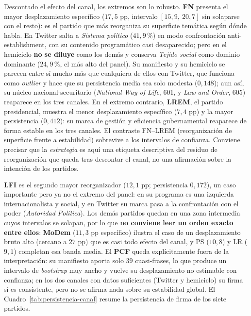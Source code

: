 Descontado el efecto del canal, los extremos son lo robusto. \textbf{FN} presenta
el mayor desplazamiento específico ($17{,}5$ pp, intervalo $[15{,}9,\ 20{,}7]$ sin
solaparse con el resto): es el partido que más reorganiza su superficie temática
según dónde habla. En Twitter salta a \emph{Sistema político} ($41{,}9\,\%$) en
modo confrontación anti-establishment, con su contenido programático casi
desaparecido; pero en el hemiciclo \textbf{no se diluye} como los demás y conserva
\emph{Tejido social} como dominio dominante ($24{,}9\,\%$, el más alto del
panel). Su manifiesto y su hemiciclo se parecen entre sí mucho más que cualquiera
de ellos con Twitter, que funciona como \emph{outlier} y hace que su persistencia
media sea solo modesta ($0{,}148$); aun así, su núcleo nacional-securitario
(\emph{National Way of Life}, 601, y \emph{Law and Order}, 605) reaparece en
los tres canales. En el extremo contrario, \textbf{LREM}, el partido presidencial,
muestra el menor desplazamiento específico ($7{,}4$ pp) y la mayor persistencia
($0{,}412$): su marca de gestión y eficiencia gubernamental reaparece de forma
estable en los tres canales. El contraste FN--LREM (reorganización de superficie
frente a estabilidad) sobrevive a los intervalos de confianza. Conviene precisar
que la \emph{estrategia} es aquí una etiqueta descriptiva del residuo de
reorganización que queda tras descontar el canal, no una afirmación sobre la
intención de los partidos.

\textbf{LFI} es el segundo mayor reorganizador ($12{,}1$ pp; persistencia
$0{,}172$), un caso importante pero ya no el extremo del panel: en su programa es
una izquierda internacionalista y social, y en Twitter su marca pasa a la
confrontación con el poder (\emph{Autoridad Política}). Los demás partidos quedan
en una zona intermedia cuyos intervalos se solapan, por lo que \textbf{no conviene
leer un orden exacto entre ellos}: \textbf{MoDem} ($11{,}3$ pp específico) ilustra
el caso de un desplazamiento bruto alto (cercano a $27$ pp) que es casi todo
efecto del canal, y PS ($10{,}8$) y LR ($9{,}1$) completan esa banda media. El
\textbf{PCF} queda explícitamente fuera de la interpretación: su manifiesto aporta
solo $39$ cuasi-frases, lo que produce un intervalo de \emph{bootstrap} muy ancho
y vuelve su desplazamiento no estimable con confianza; en los dos canales con
datos suficientes (Twitter y hemiciclo) su firma sí es consistente, pero no se
afirma nada sobre su estabilidad global. El Cuadro~\ref{tab:persistencia-canal}
resume la persistencia de firma de los siete partidos.

